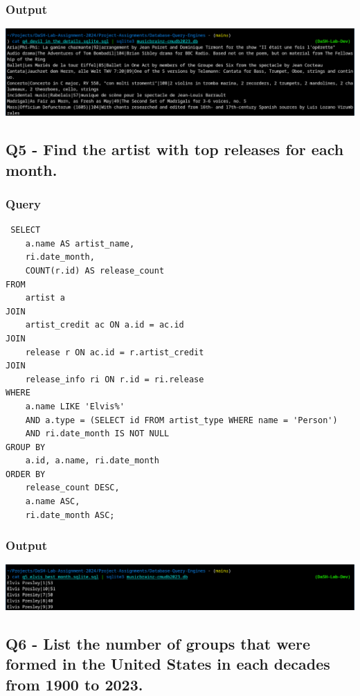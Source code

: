 \documentclass[11pt]{article}
\begin{document}
\subsubsection{Output}
\label{sec:org8c59a2e}
\begin{center}
\includegraphics[width=.9\linewidth]{./images/Q4.png}
\end{center}
\subsection{Q5 - Find the artist with top releases for each month.}
\label{sec:org470831d}
\subsubsection{Query}
\label{sec:orgef66427}
\begin{verbatim}
 SELECT
    a.name AS artist_name,
    ri.date_month,
    COUNT(r.id) AS release_count
FROM
    artist a
JOIN
    artist_credit ac ON a.id = ac.id
JOIN
    release r ON ac.id = r.artist_credit
JOIN
    release_info ri ON r.id = ri.release
WHERE
    a.name LIKE 'Elvis%'
    AND a.type = (SELECT id FROM artist_type WHERE name = 'Person')
    AND ri.date_month IS NOT NULL
GROUP BY
    a.id, a.name, ri.date_month
ORDER BY
    release_count DESC,
    a.name ASC,
    ri.date_month ASC;
\end{verbatim}
\subsubsection{Output}
\label{sec:orgf06e305}
\begin{center}
\includegraphics[width=.9\linewidth]{./images/Q5.png}
\end{center}
\subsection{Q6 - List the number of groups that were formed in the United States in each decades from 1900 to 2023.}
\label{sec:org94123be}
\end{document}
